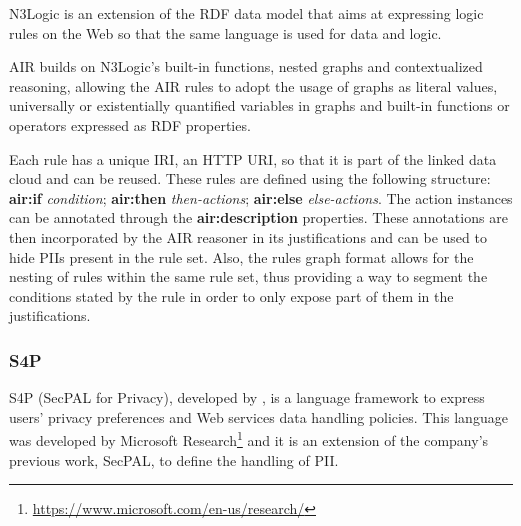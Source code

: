 N3Logic is an extension of the RDF data model that aims at expressing logic rules on the Web so that the same language is used for data and logic.

AIR builds on N3Logic's built-in functions, nested graphs and contextualized reasoning, allowing the AIR rules to adopt the usage of graphs as literal values, universally or existentially quantified variables in graphs and built-in functions or operators expressed as RDF properties.

Each rule has a unique IRI, an HTTP URI, so that it is part of the linked data cloud and can be reused.
These rules are defined using the following structure: \textbf{air:if} \textit{condition}; \textbf{air:then} \textit{then-actions}; \textbf{air:else} \textit{else-actions}.
The action instances can be annotated through the \textbf{air:description} properties.
These annotations are then incorporated by the AIR reasoner in its justifications and can be used to hide PIIs present in the rule set.
Also, the rules graph format allows for the nesting of rules within the same rule set, thus providing a way to segment the conditions stated by the rule in order to only expose part of them in the justifications.

\subsubsection{S4P}
\label{sec:s4p}

S4P (SecPAL for Privacy), developed by \cite{becker_framework_2009, becker_s4p_2010}, is a language framework to express users' privacy preferences and Web services data handling policies.
This language was developed by Microsoft Research\footnote{\url{https://www.microsoft.com/en-us/research/}} and it is an extension of the company's previous work, SecPAL, to define the handling of PII.

